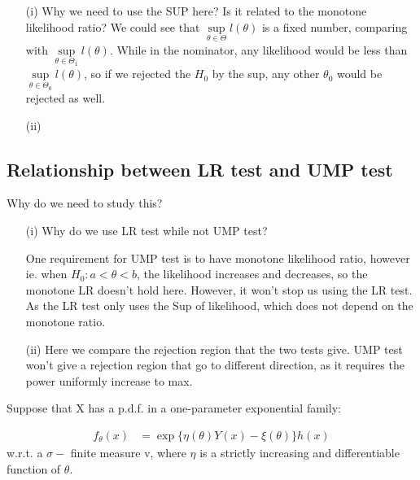 \documentclass[11pt]{article} %
\begin{document}
\begin{itemize}
	\item [(i)] Why we need to use the SUP here? Is it related to the monotone likelihood ratio?
	We could see that $\underset{\theta \in \Theta}{\sup} l(\theta)$ is a fixed number, comparing with $\underset{\theta \in \Theta_1}{\sup} l(\theta)$. While in the nominator, any likelihood would be less than $\underset{\theta \in \Theta_0}{\sup} l(\theta)$, so if we rejected the $H_0$ by the sup, any other $\theta_0$ would be rejected as well. 
	
	
	\item[(ii)]

\end{itemize}


\subsection{Relationship between LR test and UMP test}

Why do we need to study this?
\begin{itemize}
	\item [(i)] Why do we use LR test while not UMP test?
	
	One requirement for UMP test is to have monotone likelihood ratio, however ie. when $H_0: a < \theta <b$, the likelihood increases and decreases, so the monotone LR doesn't hold here. However, it won't stop us using the LR test. 
	As the LR test only uses the Sup of likelihood, which does not depend on the monotone ratio.
	
	\item[(ii)] Here we compare the rejection region that the two tests give. UMP test won't give a rejection region that go to different direction, as it requires the power uniformly increase to max. 

\end{itemize}
	

Suppose that X has a p.d.f. in a one-parameter exponential family: 
 
\begin{align*}
	f_{\theta}(x) &= \exp \{ \eta (\theta) Y(x) - \xi(\theta)  \} h(x) 
\end{align*}
w.r.t. a $\sigma-$ finite measure v, where $\eta$ is a strictly increasing and differentiable function of $\theta$.
\end{document}
